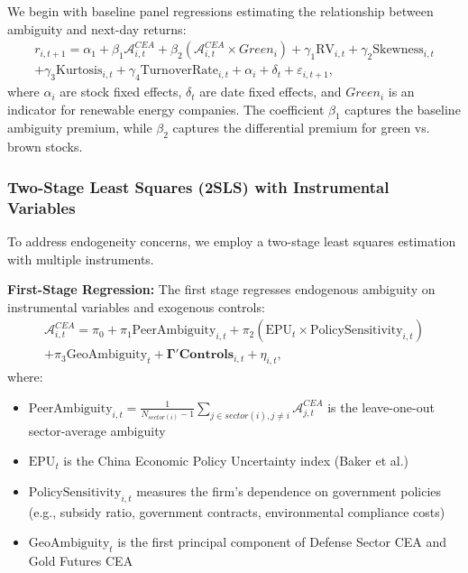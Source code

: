 \documentclass[preprint,12pt,authoryear]{elsarticle}
\begin{document}
We begin with baseline panel regressions estimating the relationship between ambiguity and next-day returns:
\begin{equation}
\begin{split}
r_{i,t+1} = \alpha_1 + \beta_1 \mathcal{A}^{CEA}_{i,t} + \beta_2 (\mathcal{A}^{CEA}_{i,t} \times Green_i) + \gamma_1 \text{RV}_{i,t} + \gamma_2 \text{Skewness}_{i,t} \\
+ \gamma_3 \text{Kurtosis}_{i,t} + \gamma_4 \text{TurnoverRate}_{i,t} + \alpha_i + \delta_t + \varepsilon_{i,t+1},
\end{split}
\end{equation}
where $\alpha_i$ are stock fixed effects, $\delta_t$ are date fixed effects, and $Green_i$ is an indicator for renewable energy companies. The coefficient $\beta_1$ captures the baseline ambiguity premium, while $\beta_2$ captures the differential premium for green vs. brown stocks.

\subsubsection{Two-Stage Least Squares (2SLS) with Instrumental Variables}

To address endogeneity concerns, we employ a two-stage least squares estimation with multiple instruments.

\textbf{First-Stage Regression:} The first stage regresses endogenous ambiguity on instrumental variables and exogenous controls:
\begin{equation}
\begin{split}
\mathcal{A}^{CEA}_{i,t} = \pi_0 + \pi_1 \text{PeerAmbiguity}_{i,t} + \pi_2 (\text{EPU}_{t} \times \text{PolicySensitivity}_{i,t}) \\
+ \pi_3 \text{GeoAmbiguity}_{t} + \boldsymbol{\Gamma}'\mathbf{Controls}_{i,t} + \eta_{i,t},
\end{split}
\end{equation}
where:
\begin{itemize}
\item $\text{PeerAmbiguity}_{i,t} = \frac{1}{N_{sector(i)}-1} \sum_{j \in sector(i), j \neq i} \mathcal{A}^{CEA}_{j,t}$ is the leave-one-out sector-average ambiguity
\item $\text{EPU}_{t}$ is the China Economic Policy Uncertainty index (Baker et al.)
\item $\text{PolicySensitivity}_{i,t}$ measures the firm's dependence on government policies (e.g., subsidy ratio, government contracts, environmental compliance costs)
\item $\text{GeoAmbiguity}_{t}$ is the first principal component of Defense Sector CEA and Gold Futures CEA
\end{itemize}
\end{document}
